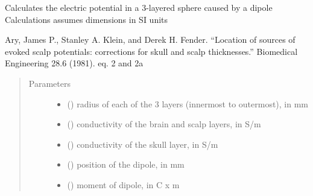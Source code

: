 \documentclass[letterpaper,10pt,english,openany,oneside]{sphinxmanual}
\begin{document}
\begin{fulllineitems}
\label{\detokenize{pygpc:pygpc.testfun.calc_potential_dipole_3layers}}
Calculates the electric potential in a 3-layered sphere caused by a dipole
Calculations assumes dimensions in SI units

Ary, James P., Stanley A. Klein, and Derek H. Fender.
“Location of sources of evoked scalp potentials: corrections for skull and scalp thicknesses.”
Biomedical Engineering 28.6 (1981).
eq. 2 and 2a
\begin{quote}\begin{description}
\item[{Parameters}] \leavevmode\begin{itemize}
\item {} 
 (\sphinxstyleliteralemphasis{\sphinxupquote{{[}}}\sphinxstyleliteralemphasis{\sphinxupquote{{]}}}) \textendash{} radius of each of the 3 layers (innermost to outermost), in mm

\item {} 
 () \textendash{} conductivity of the brain and scalp layers, in S/m

\item {} 
 () \textendash{} conductivity of the skull layer, in S/m

\item {} 
 (\sphinxstyleliteralemphasis{\sphinxupquote{{[}}}\sphinxstyleliteralemphasis{\sphinxupquote{{]} }}) \textendash{} position of the dipole, in mm

\item {} 
 (\sphinxstyleliteralemphasis{\sphinxupquote{{[}}}\sphinxstyleliteralemphasis{\sphinxupquote{{]} }}) \textendash{} moment of dipole, in C x m


\end{itemize}
\end{description}
\end{quote}
\end{fulllineitems}
\end{document}
